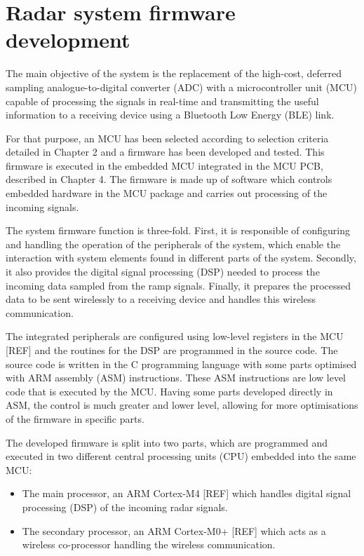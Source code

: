 \chapter{Radar system firmware development}\label{sec:radar-system-firmware-development}
The main objective of the system is the replacement of the high-cost, deferred sampling analogue-to-digital converter (ADC) with a microcontroller unit (MCU) capable of processing the signals in real-time and transmitting the useful information to a receiving device using a Bluetooth Low Energy (BLE) link.

For that purpose, an MCU has been selected according to selection criteria detailed in Chapter 2 and a firmware has been developed and tested. This firmware is executed in the embedded MCU integrated in the MCU PCB, described in Chapter 4. %
The firmware is made up of software which controls embedded hardware in the MCU package and carries out processing of the incoming signals.

The system firmware function is three-fold. First, it is responsible of configuring and handling the operation of the peripherals of the system, which enable the interaction with system elements found in different parts of the system. Secondly, it also provides the digital signal processing (DSP) needed to process the incoming data sampled from the ramp signals. Finally, it prepares the processed data to be sent wirelessly to a receiving device and handles this wireless communication.

The integrated peripherals are configured using low-level registers in the MCU [REF] and the routines for the DSP are programmed in the source code. The source code is written in the C programming language with some parts optimised with ARM assembly (ASM) instructions. These ASM instructions are low level code that is executed by the MCU. Having some parts developed directly in ASM, the control is much greater and lower level, allowing for more optimisations of the firmware in specific parts.

The developed firmware is split into two parts, which are programmed and executed in two different central processing units (CPU) embedded into the same MCU:
\begin{itemize}
	\item The main processor, an ARM Cortex-M4 [REF] which handles digital signal processing (DSP) of the incoming radar signals.
	\item The secondary processor, an ARM Cortex-M0+ [REF] which acts as a wireless co-processor handling the wireless communication.
\end{itemize}


